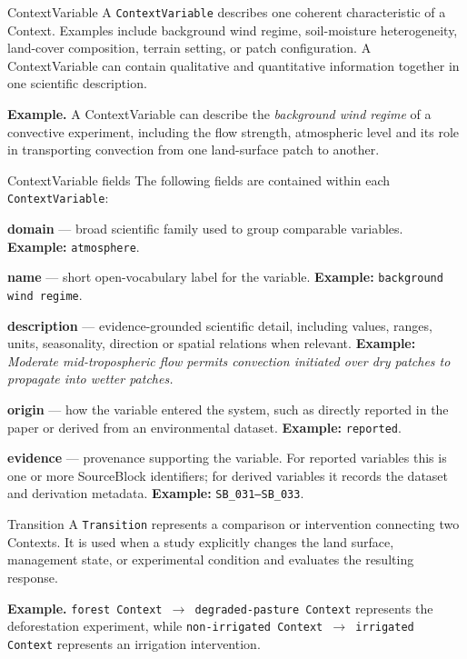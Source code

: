 \documentclass[10pt,twocolumn]{article}
\begin{document}
\begin{definitionbox}{ContextVariable}
A \texttt{ContextVariable} describes one coherent characteristic of a Context. Examples include background wind regime, soil-moisture heterogeneity, land-cover composition, terrain setting, or patch configuration. A ContextVariable can contain qualitative and quantitative information together in one scientific description.

\textbf{Example.} A ContextVariable can describe the \emph{background wind regime} of a convective experiment, including the flow strength, atmospheric level and its role in transporting convection from one land-surface patch to another.
\end{definitionbox}

\begin{subdefinitionbox}{ContextVariable fields}
The following fields are contained within each \texttt{ContextVariable}:

\textbf{domain} --- broad scientific family used to group comparable variables. \textbf{Example:} \texttt{atmosphere}.

\textbf{name} --- short open-vocabulary label for the variable. \textbf{Example:} \texttt{background wind regime}.

\textbf{description} --- evidence-grounded scientific detail, including values, ranges, units, seasonality, direction or spatial relations when relevant. \textbf{Example:} \emph{Moderate mid-tropospheric flow permits convection initiated over dry patches to propagate into wetter patches.}

\textbf{origin} --- how the variable entered the system, such as directly reported in the paper or derived from an environmental dataset. \textbf{Example:} \texttt{reported}.

\textbf{evidence} --- provenance supporting the variable. For reported variables this is one or more SourceBlock identifiers; for derived variables it records the dataset and derivation metadata. \textbf{Example:} \texttt{SB\_031--SB\_033}.
\end{subdefinitionbox}

\begin{definitionbox}{Transition}
A \texttt{Transition} represents a comparison or intervention connecting two Contexts. It is used when a study explicitly changes the land surface, management state, or experimental condition and evaluates the resulting response.

\textbf{Example.} \texttt{forest Context $\rightarrow$ degraded-pasture Context} represents the deforestation experiment, while \texttt{non-irrigated Context $\rightarrow$ irrigated Context} represents an irrigation intervention.
\end{definitionbox}
\end{document}

